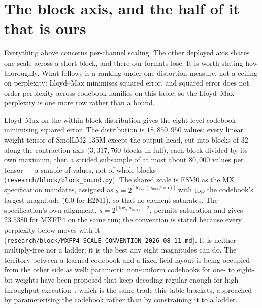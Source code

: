 \documentclass[11pt]{article}
\theoremstyle{definition}
\begin{document}
\section{The block axis, and the half of it that is ours}
\label{sec:blockbound}

Everything above concerns per-channel scaling. The other deployed axis shares
one scale across a short block, and there our formats lose. It is worth stating
how thoroughly. What follows is a ranking under one distortion measure, not a ceiling on perplexity: Lloyd--Max minimises squared error, and squared error does not order perplexity across codebook families on this table, so the Lloyd--Max perplexity is one more row rather than a bound.

Lloyd--Max on the within-block distribution gives the eight-level codebook minimising squared error. The distribution is $18{,}850{,}950$ values: every linear weight tensor of SmolLM2-135M except the output head, cut into blocks of $32$ along the contraction axis ($3{,}317{,}760$ blocks in full), each block divided by its own maximum, then a strided subsample of at most about $80{,}000$ values per tensor --- a sample of values, not of whole blocks (\texttt{research/block/block\_bound.py}). The shared scale is E8M0 as the MX specification mandates, assigned as $s=2^{\lceil\log_2(a_{\max}/\mathrm{top})\rceil}$ with $\mathrm{top}$ the codebook's largest magnitude ($6.0$ for E2M1), so that no element saturates. The specification's own alignment, $s=2^{\lfloor\log_2 a_{\max}\rfloor-2}$, permits saturation and gives $23.5380$ for MXFP4 on the same run; the convention is stated because every perplexity below moves with it (\texttt{research/block/MXFP4\_SCALE\_CONVENTION\_2026-08-11.md}). It is
neither multiply-free nor a ladder; it is the best any eight magnitudes can do.
The territory between a learned codebook and a fixed field layout is being
occupied from the other side as well: parametric non-uniform codebooks for one- to
eight-bit weights have been proposed that keep decoding regular enough for
high-throughput execution~\cite{gao2026cubicquant}, which is the same trade this
table brackets, approached by parameterising the codebook rather than by
constraining it to a ladder.
\end{document}
